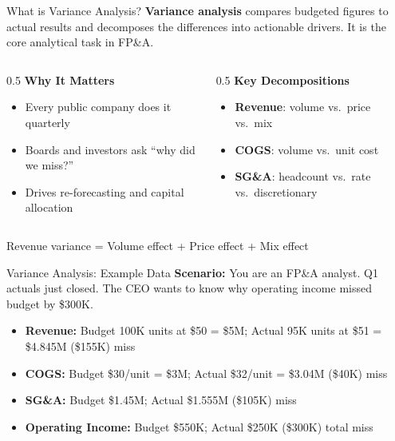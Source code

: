 \documentclass[aspectratio=169]{beamer}
\begin{document}
\begin{frame}{What is Variance Analysis?}
\textbf{Variance analysis} compares \alert{budgeted} figures to \alert{actual} results and decomposes the differences into actionable drivers. It is the core analytical task in FP\&A.
\vspace{0.3cm}
\begin{columns}[T]
\begin{column}{0.5\textwidth}
\textbf{Why It Matters}
\begin{itemize}\small
  \item Every public company does it quarterly
  \item Boards and investors ask ``why did we miss?''
  \item Drives re-forecasting and capital allocation
\end{itemize}
\end{column}
\begin{column}{0.5\textwidth}
\textbf{Key Decompositions}
\begin{itemize}\small
  \item \textbf{Revenue}: volume vs.\ price vs.\ mix
  \item \textbf{COGS}: volume vs.\ unit cost
  \item \textbf{SG\&A}: headcount vs.\ rate vs.\ discretionary
\end{itemize}
\end{column}
\end{columns}
\vspace{0.3cm}
Revenue variance = \alert{Volume effect} + \alert{Price effect} + \alert{Mix effect}
\end{frame}

\begin{frame}{Variance Analysis: Example Data}
\textbf{Scenario:} You are an FP\&A analyst. Q1 actuals just closed. The CEO wants to know why operating income missed budget by \$300K.
\vspace{0.3cm}
\begin{itemize}
  \item \textbf{Revenue:} Budget 100K units at \$50 = \$5M; Actual 95K units at \$51 = \$4.845M \quad \alert{(\$155K) miss}
  \item \textbf{COGS:} Budget \$30/unit = \$3M; Actual \$32/unit = \$3.04M \quad \alert{(\$40K) miss}
  \item \textbf{SG\&A:} Budget \$1.45M; Actual \$1.555M \quad \alert{(\$105K) miss}
  \item \textbf{Operating Income:} Budget \$550K; Actual \$250K \quad \alert{(\$300K) total miss}
\end{itemize}
\end{frame}
\end{document}
